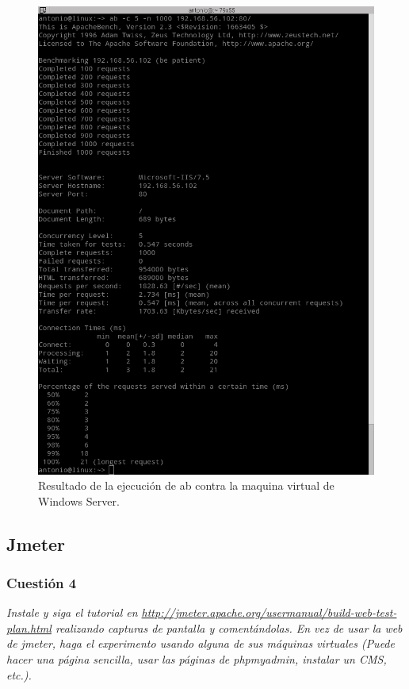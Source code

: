 \begin{figure}[H]
  \begin{center}
    \includegraphics[width=1\textwidth]{imagenes/abwin}
    \caption{Resultado de la ejecución de ab contra la maquina virtual de Windows Server.}
    \label{fig5}
  \end{center}
\end{figure}


\subsection{Jmeter}

\subsubsection{Cuestión 4}
\textit{Instale y siga el tutorial en \url{http://jmeter.apache.org/usermanual/build-web-test-plan.html} realizando capturas de pantalla y comentándolas. En vez de usar la web de jmeter, haga el experimento usando alguna de sus máquinas virtuales (Puede hacer una página sencilla, usar las páginas de phpmyadmin, instalar un CMS, etc.).}
\newline

